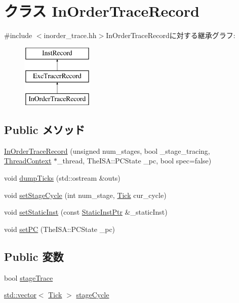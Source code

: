 \hypertarget{classTrace_1_1InOrderTraceRecord}{
\section{クラス InOrderTraceRecord}
\label{classTrace_1_1InOrderTraceRecord}
}


{\ttfamily \#include $<$inorder\_\-trace.hh$>$}InOrderTraceRecordに対する継承グラフ:\begin{figure}[H]
\begin{center}
\leavevmode
\includegraphics[height=3cm]{classTrace_1_1InOrderTraceRecord}
\end{center}
\end{figure}
\subsection*{Public メソッド}
\begin{DoxyCompactItemize}
\item 
\hyperlink{classTrace_1_1InOrderTraceRecord_a869cff44b5a42c086d284b9e2c3afeda}{InOrderTraceRecord} (unsigned num\_\-stages, bool \_\-stage\_\-tracing, \hyperlink{classThreadContext}{ThreadContext} $\ast$\_\-thread, TheISA::PCState \_\-pc, bool spec=false)
\item 
void \hyperlink{classTrace_1_1InOrderTraceRecord_afadde33f39e50889354f68ca4296a2ff}{dumpTicks} (std::ostream \&outs)
\item 
void \hyperlink{classTrace_1_1InOrderTraceRecord_a9f6f4ef19754061e12cbb7c9fa454b86}{setStageCycle} (int num\_\-stage, \hyperlink{base_2types_8hh_a5c8ed81b7d238c9083e1037ba6d61643}{Tick} cur\_\-cycle)
\item 
void \hyperlink{classTrace_1_1InOrderTraceRecord_a09099c2b21e9688c3bff2ffa0e719cc8}{setStaticInst} (const \hyperlink{classRefCountingPtr}{StaticInstPtr} \&\_\-staticInst)
\item 
void \hyperlink{classTrace_1_1InOrderTraceRecord_a227dba1d95b77dae86973f7598eafe22}{setPC} (TheISA::PCState \_\-pc)
\end{DoxyCompactItemize}
\subsection*{Public 変数}
\begin{DoxyCompactItemize}
\item 
bool \hyperlink{classTrace_1_1InOrderTraceRecord_a5552f190a6178891b46e275d9a2f4718}{stageTrace}
\item 
\hyperlink{classstd_1_1vector}{std::vector}$<$ \hyperlink{base_2types_8hh_a5c8ed81b7d238c9083e1037ba6d61643}{Tick} $>$ \hyperlink{classTrace_1_1InOrderTraceRecord_aa23c42c06ba21de41c22e82e1d63428d}{stageCycle}
\end{DoxyCompactItemize}



